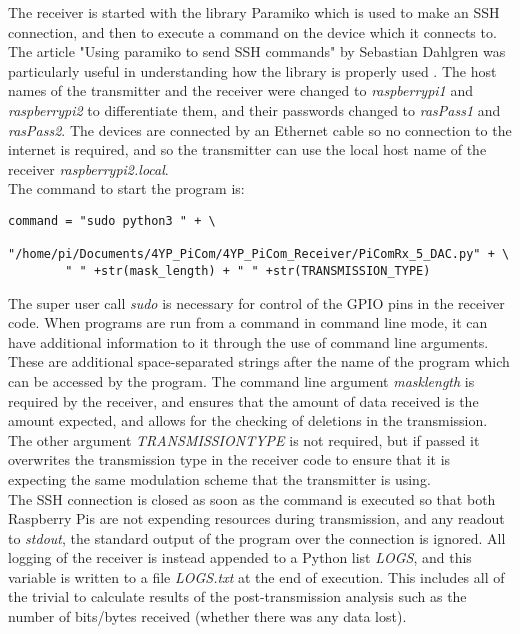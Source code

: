 \documentclass[../main.tex]{subfiles}
\begin{document}
The receiver is started with the library Paramiko \cite{lib_Paramiko} which is used to make an SSH connection, and then to execute a command on the device which it connects to.
The article "Using paramiko to send SSH commands" by Sebastian Dahlgren was particularly useful in understanding how the library is properly used \cite{web_ParamikoSSH}.
The host names of the transmitter and the receiver were changed to \textit{raspberrypi1} and \textit{raspberrypi2} to differentiate them, and their passwords changed to \textit{rasPass1} and \textit{rasPass2}.
The devices are connected by an Ethernet cable so no connection to the internet is required, and so the transmitter can use the local host name of the receiver \textit{raspberrypi2.local}.\\

The command to start the program is:

\begin{lstlisting}[caption=Command Line to Start the Receiver]
	command = "sudo python3 " + \
		"/home/pi/Documents/4YP_PiCom/4YP_PiCom_Receiver/PiComRx_5_DAC.py" + \
		" " +str(mask_length) + " " +str(TRANSMISSION_TYPE)
\end{lstlisting}

The super user call \textit{sudo} is necessary for control of the GPIO pins in the receiver code.
When programs are run from a command in command line mode, it can have additional information to it through the use of command line arguments.
These are additional space-separated strings after the name of the program which can be accessed by the program.
The command line argument \textit{mask\textunderscore length} is required by the receiver, and ensures that the amount of data received is the amount expected, and allows for the checking of deletions in the transmission.
The other argument \textit{TRANSMISSION\textunderscore TYPE} is not required, but if passed it overwrites the transmission type in the receiver code to ensure that it is expecting the same modulation scheme that the transmitter is using.\\

The SSH connection is closed as soon as the command is executed so that both Raspberry Pis are not expending resources during transmission, and any readout to \textit{stdout}, the standard output of the program over the connection is ignored.
All logging of the receiver is instead appended to a Python list \textit{LOGS}, and this variable is written to a file \textit{LOGS.txt} at the end of execution.
This includes all of the trivial to calculate results of the post-transmission analysis such as the number of bits/bytes received (whether there was any data lost).
\end{document}
